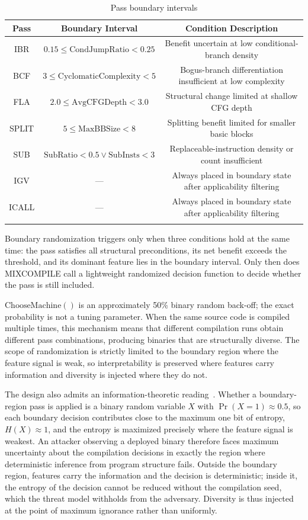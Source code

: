 \documentclass[pdflatex,sn-mathphys-num]{sn-jnl}
\theoremstyle{thmstyleone}%
\theoremstyle{thmstyletwo}%
\theoremstyle{thmstylethree}%
\begin{document}
\begin{table}[!t]
\centering
\footnotesize
\caption{Pass boundary intervals}
\label{tab:boundary}
\begin{tabular}{ccc}
\toprule
Pass & Boundary Interval & Condition Description \\
\midrule
IBR & $0.15 \leq \text{CondJumpRatio} < 0.25$ & Benefit uncertain at low conditional-branch density \\
BCF & $3 \leq \text{CyclomaticComplexity} < 5$ & Bogus-branch differentiation insufficient at low complexity \\
FLA & $2.0 \leq \text{AvgCFGDepth} < 3.0$ & Structural change limited at shallow CFG depth \\
SPLIT & $5 \leq \text{MaxBBSize} < 8$ & Splitting benefit limited for smaller basic blocks \\
SUB & $\text{SubRatio} < 0.5 \lor \text{SubInsts} < 3$ & Replaceable-instruction density or count insufficient \\
IGV & --- & Always placed in boundary state after applicability filtering \\
ICALL & --- & Always placed in boundary state after applicability filtering \\
\botrule
\end{tabular}
\end{table}

Boundary randomization triggers only when three conditions hold at the same time: the
pass satisfies all structural preconditions, its net benefit exceeds the threshold, and
its dominant feature lies in the boundary interval. Only then does MIXCOMPILE call a
lightweight randomized decision function to decide whether the pass is still included.

$\text{ChooseMachine}()$ is an approximately 50\% binary random back-off; the exact
probability is not a tuning parameter. When the same source code is compiled
multiple times, this mechanism means that different compilation runs obtain different
pass combinations, producing binaries that are structurally diverse. The scope of
randomization is strictly limited to the boundary region where the feature signal is
weak, so interpretability is preserved where features carry information and diversity
is injected where they do not.

The design also admits an information-theoretic reading~\cite{shannon1948mathematical}.
Whether a boundary-region pass is applied is a binary random variable $X$ with
$\Pr(X{=}1) \approx 0.5$, so each boundary decision contributes close to the maximum
one bit of entropy, $H(X) \approx 1$, and the entropy is maximized precisely where
the feature signal is weakest. An attacker observing a deployed binary therefore
faces maximum uncertainty about the compilation decisions in exactly the region where
deterministic inference from program structure fails. Outside the boundary region,
features carry the information and the decision is deterministic; inside it, the
entropy of the decision cannot be reduced without the compilation seed, which the
threat model withholds from the adversary. Diversity is thus injected at the point of
maximum ignorance rather than uniformly.
\end{document}
